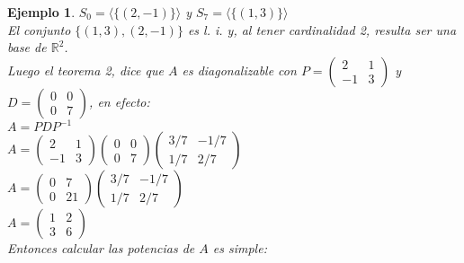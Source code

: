 \documentclass[12pt]{book}
\newtheorem{ejem}{Ejemplo}
\def\R{\mathbb{R}}
\begin{document}
{\begin{ejem}
{\hspace{6 cm}$S_{0}=\langle\{(2,-1)\}\rangle$ y $S_{7}=\langle\{(1,3)\}\rangle$\\

El conjunto $\{(1,3),(2,-1)\}$ es l. i. y, al tener cardinalidad 2, resulta ser una base de $\R^2$.\\

Luego el teorema 2, dice que $A$ es diagonalizable con $P=\left(\begin{matrix}2 & 1\\ -1 & 3 \end{matrix}\right)$ y $D=\left(\begin{matrix}0 & 0\\ 0 & 7 \end{matrix}\right)$, en efecto:\\

\hspace{4 cm}$A=PDP^{-1}$\\

\hspace{4 cm}$A=\left(\begin{matrix}2 & 1\\ -1 & 3 \end{matrix}\right)\left(\begin{matrix}0 & 0\\ 0 & 7 
\end{matrix}\right)\left(\begin{matrix}3/7 & -1/7\\ 1/7 & 2/7 \end{matrix}\right)$\\

\hspace{4 cm}$A=\left(\begin{matrix}0 & 7\\ 0 & 21 \end{matrix}\right)\left(\begin{matrix}3/7 & -1/7\\ 1/7 & 2/7 \end{matrix}\right)$\\

\hspace{4 cm}$A=\left(\begin{matrix}1 & 2\\ 3 & 6 \end{matrix}\right)$\\

Entonces calcular las potencias de $A$ es simple:

}
\end{ejem}}
\end{document}
